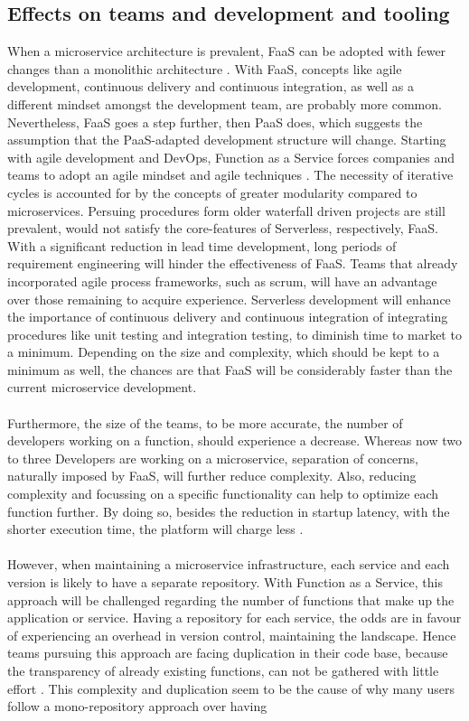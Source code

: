 \documentclass[11pt]{article}
\begin{document}
\subsection{Effects on teams and development and tooling}
When a microservice architecture is prevalent, FaaS can be adopted with fewer changes than a monolithic architecture \cite{fox2017status}. With FaaS, concepts like agile development, continuous delivery and continuous integration, as well as a different mindset amongst the development team, are probably more common. Nevertheless, FaaS goes a step further, then PaaS does, which suggests the assumption that the PaaS-adapted development structure will change. Starting with agile development and \glqq DevOps\grqq{}, Function as a Service forces companies and teams to adopt an agile mindset and agile techniques \cite{benlian2018transformative}. The necessity of iterative cycles is accounted for by the concepts of greater modularity compared to microservices. Persuing procedures form older waterfall driven projects are still prevalent, would not satisfy the core-features of Serverless, respectively, FaaS. With a significant reduction in lead time development, long periods of requirement engineering will hinder the effectiveness of FaaS. Teams that already incorporated agile process frameworks, such as scrum, will have an advantage over those remaining to acquire experience. Serverless development will enhance the importance of continuous delivery and continuous integration of integrating procedures like unit testing and integration testing, to diminish time to market to a minimum. Depending on the size and complexity, which should be kept to a minimum as well, the chances are that FaaS will be considerably faster than the current microservice development.\\\\ Furthermore, the size of the teams, to be more accurate, the number of developers working on a function, should experience a decrease. Whereas now two to three Developers are working on a microservice, separation of concerns, naturally imposed by FaaS, will further reduce complexity. Also, reducing complexity and focussing on a specific functionality can help to optimize each function further. By doing so, besides the reduction in startup latency, with the shorter execution time, the platform will charge less \cite{shafiei2020serverless}.\\\\ However, when maintaining a microservice infrastructure, each service and each version is likely to have a separate repository. With Function as a Service, this approach will be challenged regarding the number of functions that make up the application or service. Having a repository for each service, the odds are in favour of experiencing an overhead in version control, maintaining the landscape. Hence teams pursuing this approach are facing duplication in their code base, because the transparency of already existing functions, can not be gathered with little effort \cite{racicot2019quality}. This complexity and duplication seem to be the cause of why many users follow a mono-repository approach over having 
\end{document}
